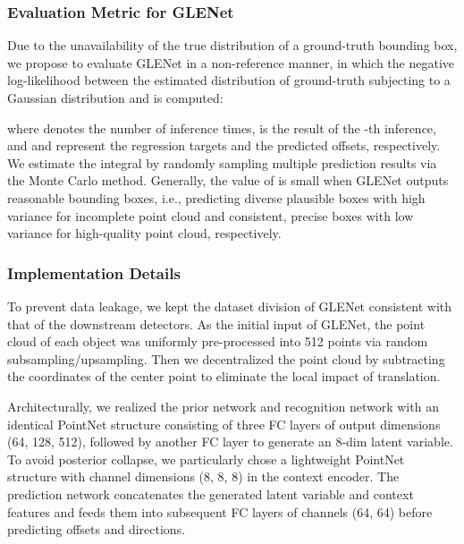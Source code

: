\documentclass[twocolumn]{svjour3}
\begin{document}
\subsubsection{Evaluation Metric for GLENet}
Due to the unavailability of the true distribution of a ground-truth bounding box, we propose to evaluate GLENet in a non-reference manner, in which the negative log-likelihood between the estimated distribution of ground-truth  subjecting to a Gaussian distribution  and  is computed:

\hspace{-0.7cm}
\resizebox{0.48\textwidth}{!}{
\begin{minipage}{\linewidth}
    
\end{minipage}
}

\noindent where  denotes the number of inference times,  is the result of the -th inference, and  and  represent the regression targets and the predicted offsets, respectively. We estimate the integral by randomly sampling multiple prediction results via the Monte Carlo method.
Generally, the value of  is small when GLENet outputs reasonable bounding boxes, i.e., predicting diverse plausible boxes with high variance for incomplete point cloud and consistent, precise boxes with low variance for high-quality point cloud, respectively.

\subsubsection{Implementation Details} 
\label{sec:imple details}
To prevent data leakage, we kept the dataset division of GLENet consistent with that of the downstream detectors. 
As the initial input of GLENet, the point cloud of each object was uniformly pre-processed into 512 points via random subsampling/upsampling. Then we decentralized the point cloud by subtracting the coordinates of the center point to eliminate the local impact of translation.


Architecturally, we realized the prior network and recognition network with an identical PointNet structure consisting of three FC layers of output dimensions (64, 128, 512), followed by another FC layer to generate an 8-dim latent variable. To avoid posterior collapse, we particularly chose a lightweight PointNet structure with channel dimensions (8, 8, 8) in the context encoder. The prediction network concatenates the generated latent variable and context features and feeds them into subsequent FC layers of channels (64, 64) before predicting offsets and directions.
\end{document}
